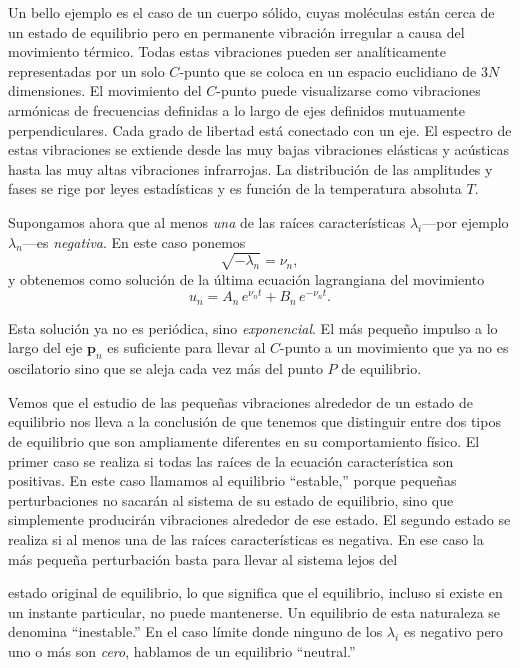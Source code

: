 \documentclass[12pt,a4paper]{book}
\newcommand{\vect}[1]{\mathbf{#1}}
\begin{document}
Un bello ejemplo es el caso de un cuerpo sólido, cuyas moléculas están cerca de un estado de equilibrio pero en permanente vibración irregular a causa del movimiento térmico. Todas estas vibraciones pueden ser analíticamente representadas por un solo $C$-punto que se coloca en un espacio euclidiano de $3N$ dimensiones. El movimiento del $C$-punto puede visualizarse como vibraciones armónicas de frecuencias definidas a lo largo de ejes definidos mutuamente perpendiculares. Cada grado de libertad está conectado con un eje. El espectro de estas vibraciones se extiende desde las muy bajas vibraciones elásticas y acústicas hasta las muy altas vibraciones infrarrojas. La distribución de las amplitudes y fases se rige por leyes estadísticas y es función de la temperatura absoluta $T$.

Supongamos ahora que al menos \textit{una} de las raíces características $\lambda_i$---por ejemplo $\lambda_n$---es \textit{negativa}. En este caso ponemos
\begin{equation}
\sqrt{-\lambda_n} = \nu_n, \tag{510.48}
\end{equation}
y obtenemos como solución de la última ecuación lagrangiana del movimiento
\begin{equation}
u_n = A_n\,e^{\nu_n t} + B_n\,e^{-\nu_n t}. \tag{510.49}
\end{equation}

Esta solución ya no es periódica, sino \textit{exponencial}. El más pequeño impulso a lo largo del eje $\vect{p}_n$ es suficiente para llevar al $C$-punto a un movimiento que ya no es oscilatorio sino que se aleja cada vez más del punto $P$ de equilibrio.

Vemos que el estudio de las pequeñas vibraciones alrededor de un estado de equilibrio nos lleva a la conclusión de que tenemos que distinguir entre dos tipos de equilibrio que son ampliamente diferentes en su comportamiento físico. El primer caso se realiza si todas las raíces de la ecuación característica son positivas. En este caso llamamos al equilibrio ``estable,'' porque pequeñas perturbaciones no sacarán al sistema de su estado de equilibrio, sino que simplemente producirán vibraciones alrededor de ese estado. El segundo estado se realiza si al menos una de las raíces características es negativa. En ese caso la más pequeña perturbación basta para llevar al sistema lejos del


estado original de equilibrio, lo que significa que el equilibrio, incluso si existe en un instante particular, no puede mantenerse. Un equilibrio de esta naturaleza se denomina ``inestable.'' En el caso límite donde ninguno de los $\lambda_i$ es negativo pero uno o más son \textit{cero}, hablamos de un equilibrio ``neutral.''
\end{document}
